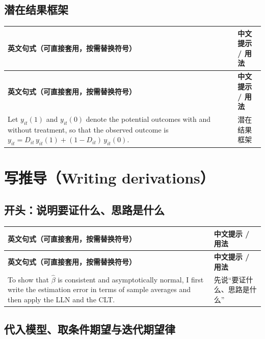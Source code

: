 \subsection{潜在结果框架}

{\renewcommand{\arraystretch}{1.15}\begin{longtable}{@{}>{\raggedright\arraybackslash}p{11.4cm}>{\raggedright\arraybackslash\small}p{4.3cm}@{}}
\toprule
\textbf{英文句式（可直接套用，按需替换符号）} & \textbf{中文提示 / 用法}\\
\midrule
\endfirsthead
\toprule
\textbf{英文句式（可直接套用，按需替换符号）} & \textbf{中文提示 / 用法}\\
\midrule
\endhead
\bottomrule
\endlastfoot
Let $y_{it}(1)$ and $y_{it}(0)$ denote the potential outcomes with and without treatment, so that the observed outcome is $y_{it}=D_{it}\,y_{it}(1)+(1-D_{it})\,y_{it}(0)$. & 潜在结果框架\\
\end{longtable}}


\section{写推导（Writing derivations）}\label{sec:UappC-deriv}

\subsection{开头：说明要证什么、思路是什么}

{\renewcommand{\arraystretch}{1.15}\begin{longtable}{@{}>{\raggedright\arraybackslash}p{11.4cm}>{\raggedright\arraybackslash\small}p{4.3cm}@{}}
\toprule
\textbf{英文句式（可直接套用，按需替换符号）} & \textbf{中文提示 / 用法}\\
\midrule
\endfirsthead
\toprule
\textbf{英文句式（可直接套用，按需替换符号）} & \textbf{中文提示 / 用法}\\
\midrule
\endhead
\bottomrule
\endlastfoot
To show that $\hat\beta$ is consistent and asymptotically normal, I first write the estimation error in terms of sample averages and then apply the LLN and the CLT. & 先说“要证什么、思路是什么”\\
\end{longtable}}


\subsection{代入模型、取条件期望与迭代期望律}

